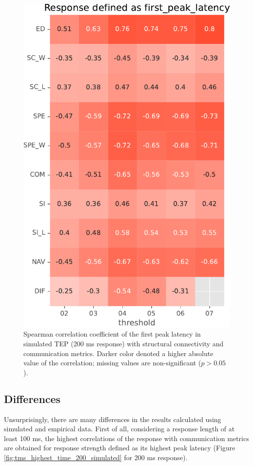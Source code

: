 \begin{figure}
    \centering
    \includegraphics[height=\textwidth]{images/nootebook_generated/tmseeg_results/simulated/200/not_over_threshold_nan/Response defined as first_peak_latency.pdf}
    \caption[TEPs first peak latency (200 ms) correlations (simulated data)]{Spearman correlation coefficient of the first peak latency in simulated TEP (200 ms response) with structural connectivity and communication metrics. Darker color denoted a higher absolute value of the correlation; missing values are non-significant ($p>0.05$).}
    \label{fig:tms_first_time_200_simulated}
\end{figure}

\subsection{Differences}

Unsurprisingly, there are many differences in the results calculated using simulated and empirical data. First of all, considering a response length of at least 100 ms, the highest correlations of the response with communication metrics are obtained for response strength defined as its highest peak latency (Figure \ref{fig:tms_highest_time_200_simulated} for 200 ms response).

